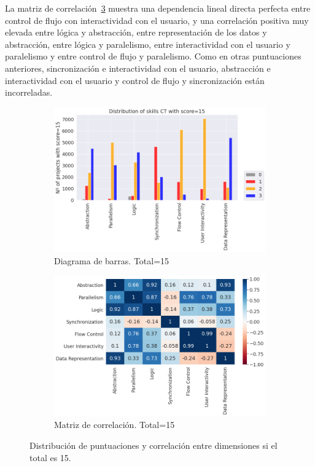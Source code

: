 \documentclass[a4paper, 12pt]{book}
\begin{document}
La matriz de correlación~\ref{fig:corr15} muestra una dependencia lineal directa perfecta entre control de flujo con interactividad con el usuario, y una correlación positiva muy elevada entre lógica y abstracción, entre representación de los datos y abstracción, entre lógica y paralelismo, entre interactividad con el usuario y paralelismo y entre control de flujo y paralelismo. Como en otras puntuaciones anteriores, sincronización e interactividad con el usuario, abstracción e interactividad con el usuario y control de flujo y sincronización están incorreladas.

\begin{figure}[H]
    \centering
    \begin{subfigure}[h]{.49\textwidth} 
        \includegraphics[width=\textwidth]{img/distribucion_15_Scratch}
        \caption{Diagrama de barras. Total=15}
        \label{fig:total15}
    \end{subfigure}       
    \begin{subfigure}[h]{.49\textwidth} 
        \includegraphics[width=\textwidth]{img/corr_15_Scratch}
        \caption{Matriz de correlación. Total=15}
        \label{fig:corr15}
    \end{subfigure}
     \caption{Distribución de puntuaciones y correlación entre dimensiones si el total es 15.}
\end{figure}
\end{document}

